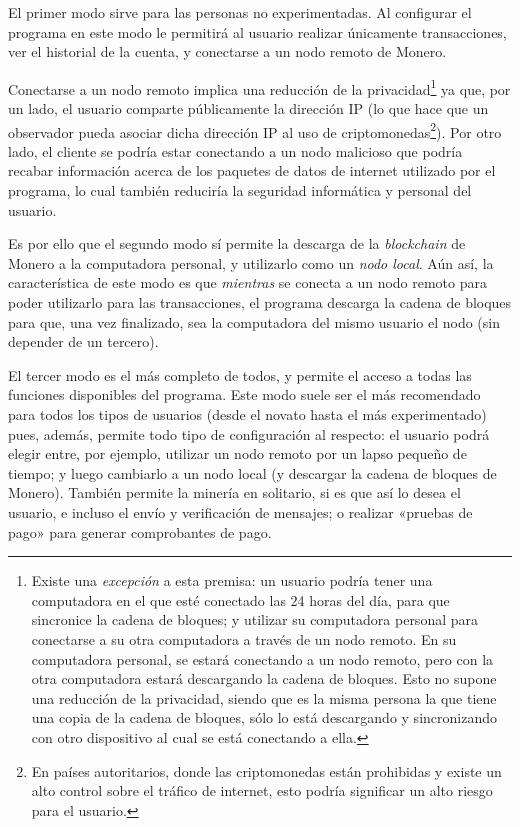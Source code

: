 \documentclass[12pt,a4paper,twoside]{book}
\begin{document}
El primer modo sirve para las personas no experimentadas. Al configurar el programa en este modo le permitirá al usuario realizar únicamente transacciones, ver el historial de la cuenta, y conectarse a un nodo remoto de Monero.

Conectarse a un nodo remoto implica una reducción de la privacidad\footnote{Existe una \textit{excepción} a esta premisa: un usuario podría tener una computadora en el que esté conectado las 24 horas del día, para que sincronice la cadena de bloques; y utilizar su computadora personal para conectarse a su otra computadora a través de un nodo remoto. En su computadora personal, se estará conectando a un nodo remoto, pero con la otra computadora estará descargando la cadena de bloques. Esto no supone una reducción de la privacidad, siendo que es la misma persona la que tiene una copia de la cadena de bloques, sólo lo está descargando y sincronizando con otro dispositivo al cual se está conectando a ella.} ya que, por un lado, el usuario comparte públicamente la dirección IP (lo que hace que un observador pueda asociar dicha dirección IP al uso de criptomonedas\footnote{En países autoritarios, donde las criptomonedas están prohibidas y existe un alto control sobre el tráfico de internet, esto podría significar un alto riesgo para el usuario.}). Por otro lado, el cliente se podría estar conectando a un nodo malicioso que podría recabar información acerca de los paquetes de datos de internet utilizado por el programa, lo cual también reduciría la seguridad informática y personal del usuario.

Es por ello que el segundo modo sí permite la descarga de la \textit{blockchain} de Monero a la computadora personal, y utilizarlo como un \textit{nodo local}. Aún así, la característica de este modo es que \textit{mientras} se conecta a un nodo remoto para poder utilizarlo para las transacciones, el programa descarga la cadena de bloques para que, una vez finalizado, sea la computadora del mismo usuario el nodo (sin depender de un tercero).

El tercer modo es el más completo de todos, y permite el acceso a todas las funciones disponibles del programa. Este modo suele ser el más recomendado para todos los tipos de usuarios (desde el novato hasta el más experimentado) pues, además, permite todo tipo de configuración al respecto: el usuario podrá elegir entre, por ejemplo, utilizar un nodo remoto por un lapso pequeño de tiempo; y luego cambiarlo a un nodo local (y descargar la cadena de bloques de Monero). También permite la minería en solitario, si es que así lo desea el usuario, e incluso el envío y verificación de mensajes; o realizar «pruebas de pago» para generar comprobantes de pago.
\end{document}
